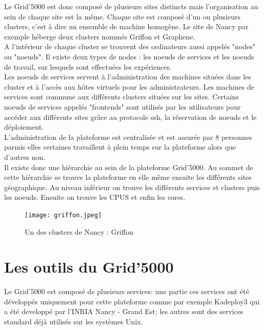 \documentclass[a4paper, 10pt, onecolumn]{report}
\begin{document}
Le Grid'5000 est donc composé de plusieurs sites distincts mais l'organisation au sein de chaque site est la même. Chaque site est composé d'un ou plusieurs clusters, c'est à dire un ensemble de machine homogène. Le site de Nancy par exemple héberge deux clusters nommés Griffon et Graphene. \\
A l'intérieur de chaque cluster se trouvent des ordinateurs aussi appelés "nodes" ou "noeuds". Il existe deux types de nodes : les noeuds de services et les noeuds de travail, sur lesquels sont effectuées les expériences.\\
 Les noeuds de services servent à l'administration des machines situées dans les cluster et à l'accès aux hôtes virtuels pour les administrateurs. Les machines de services sont commune aux différents clusters situées sur les sites. Certains noeuds de services appelés "frontends" sont utilisés par les utilisateurs pour accéder aux différents sites grâce au protocole ssh, la réservation de noeuds et le déploiement. \\
L'administration de la plateforme est centralisée et est assurée par 8 personnes parmis elles certaines travaillent à plein temps sur la plateforme alors que d'autres non.\\
Il existe donc une hiérarchie au sein de  la plateforme Grid'5000. Au sommet de cette hiérarchie se trouve la plateforme en elle m\^eme ensuite les différents sites géographique. Au niveau inférieur on trouve les différents services et clusters puis les noeuds.  Ensuite on trouve les CPUS et enfin les cores.
	\begin{figure}[!h]
		\centering
   		\texttt{[image: griffon.jpeg]}
   		\caption{Un des clusters de Nancy : Griffon}
    	\label{fig:griffon}
	\end{figure}
	
	\section{Les outils du Grid'5000}
		Le Grid'5000 est composé de plusieurs services: une partie ces services ont été développés uniquement pour cette plateforme comme par exemple Kadeploy3 qui a été developpé par l'INRIA Nancy - Grand Est; les autres sont des services standard déjà utilisés sur les systèmes Unix.  
\end{document}
